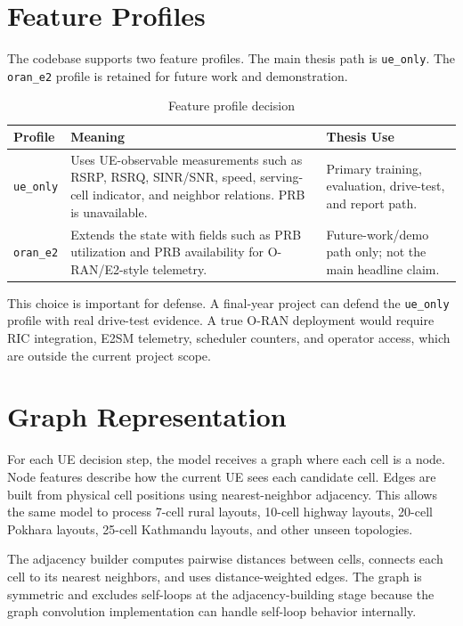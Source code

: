 \documentclass[12pt,a4paper]{report}
\newcommand{\ueonly}{\texttt{ue\_only}}
\newcommand{\orane}{\texttt{oran\_e2}}
\begin{document}
\section{Feature Profiles}
The codebase supports two feature profiles. The main thesis path is \ueonly. The \orane{} profile is retained for future work and demonstration.

\begin{table}[H]
\centering
\caption{Feature profile decision}
\begin{tabularx}{\textwidth}{p{}Y Y}
\toprule
\textbf{Profile} & \textbf{Meaning} & \textbf{Thesis Use}\\
\midrule
\ueonly & Uses UE-observable measurements such as RSRP, RSRQ, SINR/SNR, speed, serving-cell indicator, and neighbor relations. PRB is unavailable. & Primary training, evaluation, drive-test, and report path.\\
\orane & Extends the state with fields such as PRB utilization and PRB availability for O-RAN/E2-style telemetry. & Future-work/demo path only; not the main headline claim.\\
\bottomrule
\end{tabularx}
\end{table}

This choice is important for defense. A final-year project can defend the \ueonly{} profile with real drive-test evidence. A true O-RAN deployment would require RIC integration, E2SM telemetry, scheduler counters, and operator access, which are outside the current project scope.

\section{Graph Representation}
For each UE decision step, the model receives a graph where each cell is a node. Node features describe how the current UE sees each candidate cell. Edges are built from physical cell positions using nearest-neighbor adjacency. This allows the same model to process 7-cell rural layouts, 10-cell highway layouts, 20-cell Pokhara layouts, 25-cell Kathmandu layouts, and other unseen topologies.

The adjacency builder computes pairwise distances between cells, connects each cell to its nearest neighbors, and uses distance-weighted edges. The graph is symmetric and excludes self-loops at the adjacency-building stage because the graph convolution implementation can handle self-loop behavior internally.
\end{document}
